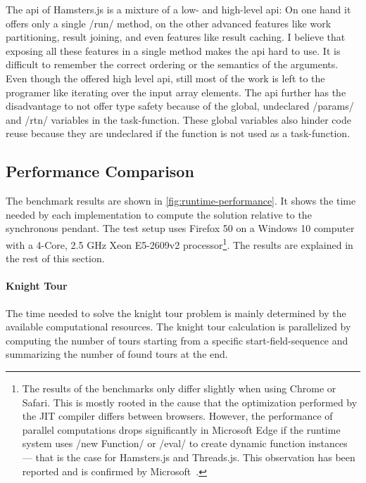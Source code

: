 The api of Hamsters.js is a mixture of a low- and high-level api: On one hand it offers only a single \javascriptinline/run/ method, on the other advanced features like work partitioning, result joining, and even features like result caching. I believe that exposing all these features in a single method makes the api hard to use. It is difficult to remember the correct ordering or the semantics of the arguments. Even though the offered high level api, still most of the work is left to the programer like iterating over the input array elements. The api further has the disadvantage to not offer type safety because of the global, undeclared \javascriptinline/params/ and \javascriptinline/rtn/ variables in the task-function. These global variables also hinder code reuse because they are undeclared if the function is not used as a task-function. 

\subsection{Performance Comparison}
The benchmark results are shown in \cref{fig:runtime-performance}. It shows the time needed by each implementation to compute the solution relative to the synchronous pendant. The test setup uses Firefox 50 on a Windows 10 computer with a 4-Core, 2.5 GHz Xeon E5-2609v2 processor\footnote{The results of the benchmarks only differ slightly when using Chrome or Safari. This is mostly rooted in the cause that the optimization performed by the JIT compiler differs between browsers. However, the performance of parallel computations drops significantly in Microsoft Edge if the runtime system uses \javascriptinline/new Function/ or \javascriptinline/eval/ to create dynamic function instances --- that is the case for Hamsters.js and Threads.js. This observation has been reported and is confirmed by Microsoft~\cite{newFunctionWebWorkerEdge}.}. The results are explained in the rest of this section.

\begin{figure*}
		
	\caption{Runtime Performance of Parallelization Problems Relative to Synchronously Execution}
	\label{fig:runtime-performance}
\end{figure*}


\paragraph{Knight Tour} The time needed to solve the knight tour problem is mainly determined by the available computational resources. The knight tour calculation is parallelized by computing the number of tours starting from a specific start-field-sequence and summarizing the  number of found tours at the end. 

